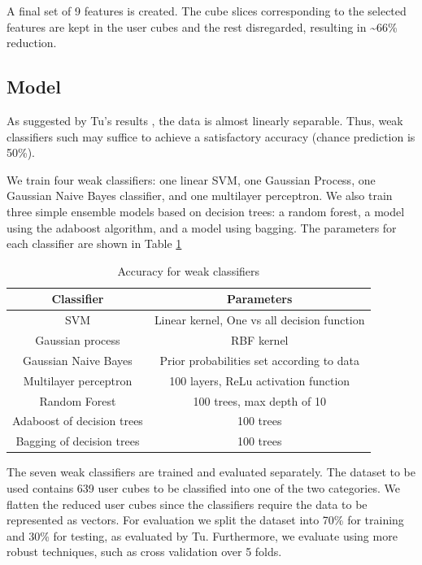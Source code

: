 \documentclass{article}
\begin{document}
A final set of 9 features is created. The cube slices corresponding to the selected features are kept in the user cubes and the rest disregarded, resulting in \textasciitilde 66\% reduction. 

\subsection{Model} 
As suggested by Tu's results \cite{tu2016impact}, the data is almost linearly separable. Thus, weak classifiers such may suffice to achieve a satisfactory accuracy (chance prediction is 50\%).

We train four weak classifiers: one linear SVM, one Gaussian Process, one Gaussian Naive Bayes classifier, and one multilayer perceptron. We also train three simple ensemble models based on decision trees: a random forest, a model using the adaboost algorithm, and a model using bagging. The parameters for each classifier are shown in Table \ref{table:classifiersParam}

\begin{table}[H]
\centering
\begin{tabular}{||c|c||}
\hline
\textbf{Classifier} & \textbf{Parameters} \\ [0.5ex] 
\hline \hline
SVM & Linear kernel, One vs all decision function \\
Gaussian process & RBF kernel\\
Gaussian Naive Bayes & Prior probabilities set according to data \\
Multilayer perceptron & 100 layers, ReLu activation function \\
Random Forest & 100 trees, max depth of 10 \\
Adaboost of decision trees & 100 trees \\
Bagging of decision trees & 100 trees\\ [1ex]
\hline 
\end{tabular}
\caption{Accuracy for weak classifiers}
\label{table:classifiersParam}
\end{table}

The seven weak classifiers are trained and evaluated separately. The dataset to be used contains 639 user cubes to be classified into one of the two categories. We flatten the reduced user cubes since the classifiers require the data to be represented as vectors. For evaluation we split the dataset into 70\% for training and 30\% for testing, as evaluated by Tu. Furthermore, we evaluate using more robust techniques, such as cross validation over 5 folds. 
\end{document}
